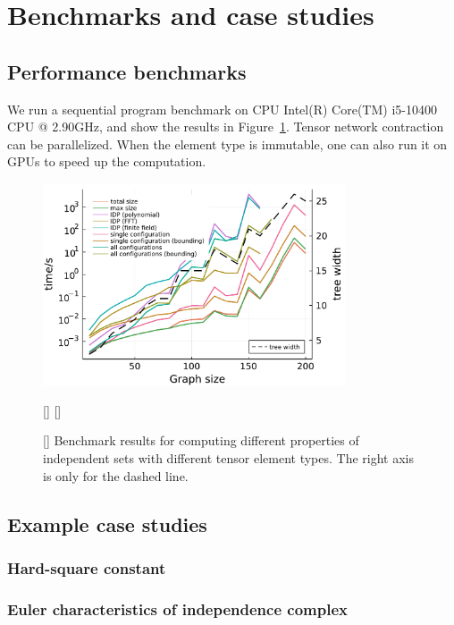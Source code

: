 \documentclass[onefignum, onetabnum]{siamart190516}
\newcommand{\<}{\langle}
\renewcommand{\>}{\rangle}
\newcommand{\red}[1]{[{\bf  \color{red}{ST: #1}}]}
\begin{document}
\section{Benchmarks and case studies}
\subsection{Performance benchmarks}
We run a sequential program benchmark on CPU Intel(R) Core(TM) i5-10400 CPU @ 2.90GHz, and show the results in Figure~\ref{fig:benchmark}. Tensor network contraction can be parallelized. When the element type is immutable, one can also run it on GPUs to speed up the computation.

\begin{figure} 
    \centering
    \includegraphics[width=0.8\textwidth, trim={0cm 0cm 0cm 0cm}, clip]{benchmark.pdf}
    \caption{\red{label x-axis as ``number of vertices, $|V|$''} Benchmark results for computing different properties of independent sets with different tensor element types. The right axis is only for the dashed line.
    }\red{split into two graphs: one with time versus number of vertices, $|V|$, and one with time versus tree width.}
    \red{We also need to show/say what types of graphs is used here for benchmarking.}
    \label{fig:benchmark}
\end{figure}

\subsection{Example case studies}
\subsubsection{Hard-square constant}

\subsubsection{Euler characteristics of independence complex}
\end{document}
